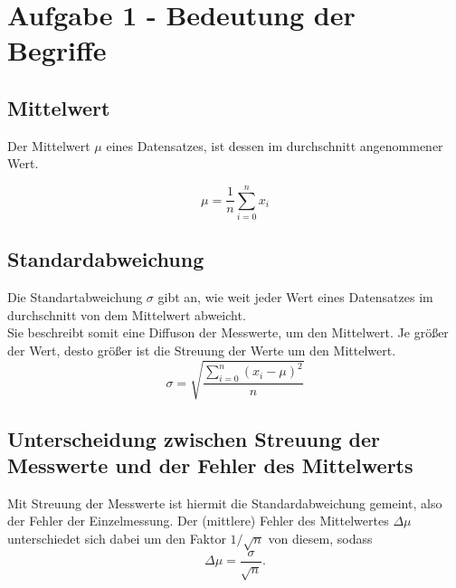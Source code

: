 \section{Aufgabe 1 - Bedeutung der Begriffe}
\subsection{Mittelwert}
    Der Mittelwert $\mu$ eines Datensatzes, ist dessen im durchschnitt angenommener Wert.

    \begin{equation*}
        \mu=\frac{1}{n}\sum_{i=0}^n x_i
    \end{equation*}
\subsection{Standardabweichung}
    Die Standartabweichung $\sigma$ gibt an, wie weit jeder Wert eines Datensatzes im durchschnitt von 
    dem Mittelwert abweicht.\\
    Sie beschreibt somit eine Diffuson der Messwerte, um den Mittelwert. Je größer der Wert, desto
    größer ist die Streuung der Werte um den Mittelwert.
    \begin{equation*}
        \sigma = \sqrt{\frac{\sum_{i=0}^n(x_i-\mu)^2}{n}}
    \end{equation*}
\subsection{Unterscheidung zwischen Streuung der Messwerte und der Fehler des Mittelwerts}
    Mit Streuung der Messwerte ist hiermit die Standardabweichung gemeint, also der Fehler der Einzelmessung.
    Der (mittlere) Fehler des Mittelwertes $\Delta \mu$ unterschiedet sich dabei um den Faktor $1/\sqrt{n}$ von diesem, sodass
    \begin{equation*}
        \Delta \mu = \frac{\sigma}{\sqrt{n}}.
    \end{equation*}

